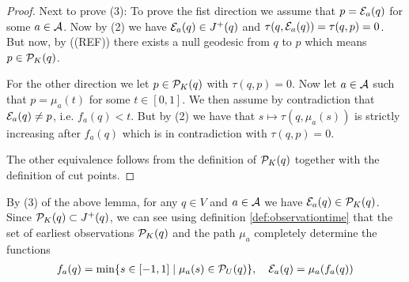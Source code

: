 \begin{proof}
Next to prove (3):
To prove the fist direction we assume that $p=\mc{E}_a(q)$ for some $a\in \mc{A}$. Now by (2) we have $\mc{E}_a(q) \in J^+(q)$ and $\tau(q,\mc{E}_a(q))=\tau(q,p)=0$. But now, by ((REF)) there exists a null geodesic from $q$ to $p$ which means $p\in \mc{P}_K(q)$. 

For the other direction we let $p\in \mc{P}_K(q)$ with $\tau(q,p)=0$. Now let $a\in \mc{A}$ such that $p=\mu_a(t)$ for some $t\in [0,1]$. We then assume by contradiction that $\mc{E}_a(q) \neq p$, i.e. $f_a(q) < t$. But by (2) we have that $s\mapsto\tau(q,\mu_a(s))$ is strictly increasing after $f_a(q)$ which is in contradiction with $\tau(q,p)=0$.

The other equivalence follows from the definition of $\mc{P}_K(q)$ together with the definition of cut points.
\end{proof}

By (3) of the above lemma, for any $q\in V$ and $a\in \ca$ we have $\mc{E}_a(q)\in \P_K(q)$. Since $\P_K(q)\subset J^+(q)$, we can see using definition \ref{def:observationtime} that the set of earliest observations $\P_K(q)$ and the path $\mu_a$ completely determine the functions
\begin{align}\label{eq:observationtimerestated}
    f_a(q) = \min \{ s\in [-1,1] \mid \mu_a(s)\in \P_U(q) \}, \quad \mc{E}_a(q) = \mu_a(f_a(q))
\end{align}



